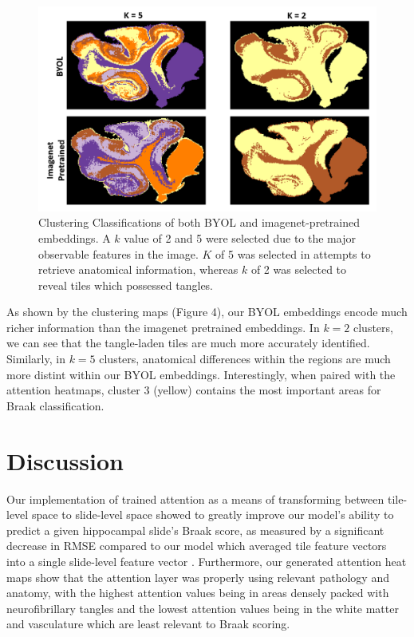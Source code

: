 \documentclass{article} %
\begin{document}
\begin{figure}[h]
\begin{center}
\includegraphics[scale=0.55]{cluster_comp.png}
\end{center}
\caption{Clustering Classifications of both BYOL and imagenet-pretrained embeddings. A \(k\) value of 2 and 5 were selected due to the major observable features in the image. \(K\) of 5 was selected in attempts to retrieve anatomical information, whereas \(k\) of 2 was selected to reveal tiles which possessed tangles.}
\end{figure}

As shown by the clustering maps (Figure 4), our BYOL embeddings encode much richer information than the imagenet pretrained embeddings. In \(k=2\) clusters, we can see that the tangle-laden tiles are much more accurately identified. Similarly, in \(k=5\) clusters, anatomical differences within the regions are much more distint within our BYOL embeddings. Interestingly, when paired with the attention heatmaps, cluster 3 (yellow) contains the most important areas for Braak classification. 

\section{Discussion}
Our implementation of trained attention as a means of transforming between tile-level space to slide-level space showed to greatly improve our model’s ability to predict a given hippocampal slide’s Braak score, as measured by a significant decrease in RMSE compared to our model which averaged tile feature vectors into a single slide-level feature vector . Furthermore, our generated attention heat maps show that the attention layer was properly using relevant pathology and anatomy, with the highest attention values being in areas densely packed with neurofibrillary tangles and the lowest attention values being in the white matter and vasculature which are least relevant to Braak scoring. 
\end{document}
